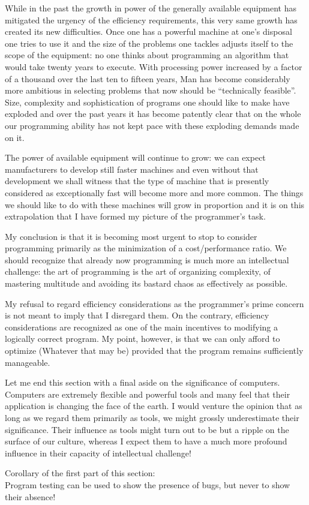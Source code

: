 While in the past the growth in power of the generally available equipment
has mitigated the urgency of the efficiency requirements, this very same growth
has created its new difficulties. Once one has a powerful machine at one's
disposal one tries to use it and the size of the problems one tackles adjusts
itself to the scope of the equipment: no one thinks about programming an
algorithm that would take twenty years to execute. With processing power
increased by a factor of a thousand over the last ten to fifteen years, Man
has become considerably more ambitious in selecting problems that now should be
``technically feasible''. Size, complexity and sophistication of programs one
should like to make have exploded and over the past years it has become
patently clear that on the whole our programming ability has not kept pace
with these exploding demands made on it.

The power of available equipment will continue to grow: we can expect
manufacturers to develop still faster machines and even without that development
we shall witness that the type of machine that is presently considered as
exceptionally fast will become more and more common. The things we should like
to do with these machines will grow in proportion and it is on this
extrapolation that I have formed my picture of the programmer's task.

My conclusion is that it is becoming most urgent to stop to consider
programming primarily as the minimization of a cost/performance ratio. We should
recognize that already now programming is much more an intellectual challenge:
the art of programming is the art of organizing complexity, of mastering
multitude and avoiding its bastard chaos as effectively as possible.

My refusal to regard efficiency considerations as the programmer's prime
concern is not meant to imply that I disregard them. On the contrary, efficiency
considerations are recognized as one of the main incentives to modifying a
logically correct program. My point, however, is that we can only afford to
optimize (Whatever that may be) provided that the program remains sufficiently
manageable.

Let me end this section with a final aside on the significance of computers.
Computers are extremely flexible and powerful tools and many feel that their
application is changing the face of the earth. I would venture the opinion that
as long as we regard them primarily as tools, we might grossly underestimate
their significance. Their influence as tools might turn out to be but a ripple
on the surface of our culture, whereas I expect them to have a much more
profound influence in their capacity of intellectual challenge!

\vspace{72pt}
\noindent Corollary of the first part of this section:\\
\indent Program testing can be used to show the presence of bugs, but never to show
their absence!
